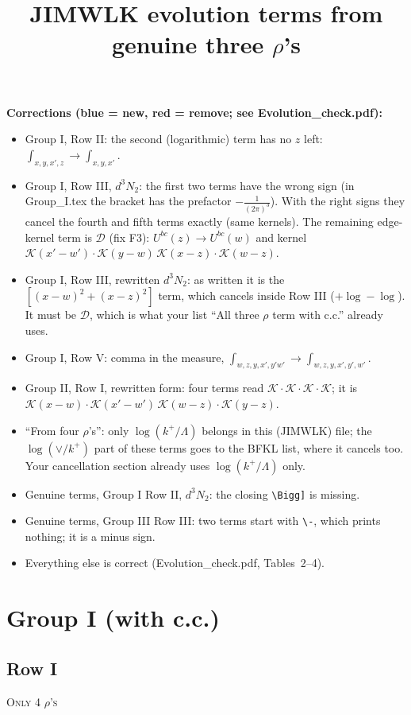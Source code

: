 \documentclass[9pt]{article}
\title{JIMWLK evolution terms from genuine three $\rho$'s}
\author{}
\date{}
\numberwithin{equation}{section}
\begin{document}
\maketitle
{\color{blue}\noindent\textbf{Corrections (blue = new, red = remove; see Evolution\_check.pdf):}
\begin{itemize}
\item Group I, Row II: the second (logarithmic) term has no $z$ left: $\int_{x,y,x',z}\to\int_{x,y,x'}$.
\item Group I, Row III, $d^3N_2$: the first two terms have the wrong sign (in Group\_I.tex the bracket has the prefactor $-\frac{1}{(2\pi)^3}$). With the right signs they cancel the fourth and fifth terms exactly (same kernels). The remaining edge-kernel term is $\mathcal D$ (fix F3): $U^{bc}(z)\to U^{bc}(w)$ and kernel $\mathcal K(x'-w')\cdot\mathcal K(y-w)\,\mathcal K(x-z)\cdot\mathcal K(w-z)$.
\item Group I, Row III, rewritten $d^3N_2$: as written it is the $[(x-w)^2+(x-z)^2]$ term, which cancels inside Row III ($+\log-\log$). It must be $\mathcal D$, which is what your list ``All three $\rho$ term with c.c.'' already uses.
\item Group I, Row V: comma in the measure, $\int_{w,z,y,x',y'w'}\to\int_{w,z,y,x',y',w'}$.
\item Group II, Row I, rewritten form: four terms read $\mathcal K\cdot\mathcal K\cdot\mathcal K\cdot\mathcal K$; it is $\mathcal K(x-w)\cdot\mathcal K(x'-w')\,\mathcal K(w-z)\cdot\mathcal K(y-z)$.
\item ``From four $\rho$'s'': only $\log(k^+/\Lambda)$ belongs in this (JIMWLK) file; the $\log(\vee/k^+)$ part of these terms goes to the BFKL list, where it cancels too. Your cancellation section already uses $\log(k^+/\Lambda)$ only.
\item Genuine terms, Group I Row II, $d^3N_2$: the closing \texttt{\textbackslash Bigg]} is missing.
\item Genuine terms, Group III Row III: two terms start with \texttt{\textbackslash-}, which prints nothing; it is a minus sign.
\item Everything else is correct (Evolution\_check.pdf, Tables~2--4).
\end{itemize}}

\section{Group I (with c.c.)}
\subsection{Row I}
\textsc{Only 4 $\rho$'s}
\end{document}
